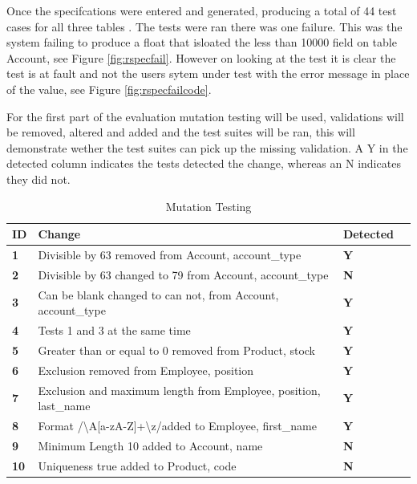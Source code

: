 \documentclass[a4paper,12pt]{article}
\begin{document}
\par Once the specifcations were entered and generated, producing a total of 44 test cases for all three tables . The tests were ran there was one failure. This was the system failing to produce a float that isloated the less than 10000 field on table Account, see Figure \ref{fig:rspecfail}. However on looking at the test it is clear the test is at fault and not the users sytem under test with the error message in place of the value, see Figure \ref{fig:rspecfailcode}.

\par For the first part of the evaluation mutation testing will be used, validations will be removed, altered and added and the test suites will be ran, this will demonstrate wether the test suites can pick up the missing validation. A Y in the detected column indicates the tests detected the change, whereas an N indicates they did not.

\begin{table}
\centering
\caption{Mutation Testing}
\label{test:1}
\begin{tabularx}{\textwidth}{|l|X|l|l|}
\hline
\textbf{ID} & \textbf{Change}                                          & \textbf{Detected} \\ \hline
\textbf{1}  & Divisible by 63 removed from Account, account\_type                       & \textbf{Y}\\ \hline
\textbf{2}  & Divisible by 63 changed to 79 from Account, account\_type                       & \textbf{N}\\ \hline
\textbf{3}  & Can be blank changed to can not, from Account, account\_type                       & \textbf{Y}\\ \hline
\textbf{4}  & Tests 1 and 3 at the same time                       & \textbf{Y}\\ \hline
\textbf{5}  & Greater than or equal to 0 removed from Product, stock & \textbf{Y}     \\ \hline
\textbf{6}  & Exclusion removed from Employee, position                 & \textbf{Y}   \\ \hline
\textbf{7}  & Exclusion and maximum length from Employee, position, last\_name               & \textbf{Y}     \\ \hline
\textbf{8}  & Format /{\textbackslash}A[a-zA-Z]+{\textbackslash}z/added to Employee, first\_name              & \textbf{Y}       \\ \hline
\textbf{9}  & Minimum Length 10 added to  Account, name             & \textbf{N}       \\ \hline
\textbf{10}  & Uniqueness true  added to  Product, code             & \textbf{N}       \\ \hline
\end{tabularx}
\end{table}
\end{document}
